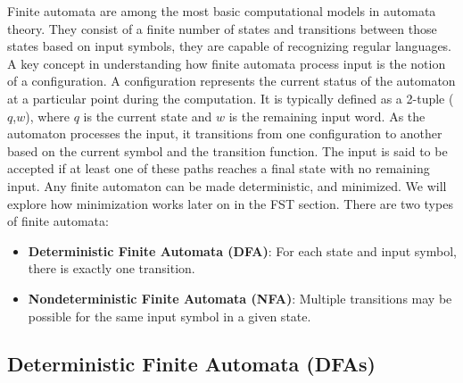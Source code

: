 Finite automata are among the most basic computational models in automata theory. 
They consist of a finite number of states and transitions between those states based on input symbols, they are capable of recognizing regular languages.
A key concept in understanding how finite automata process input is the notion of a configuration. 
A configuration represents the current status of the automaton at a particular point during the computation. 
It is typically defined as a 2-tuple (\(q\),\(w\)), where \(q\) is the current state and \(w\) is the remaining input word. 
As the automaton processes the input, it transitions from one configuration to another based on the current symbol and the transition function.
The input is said to be accepted if at least one of these paths reaches a final state with no remaining input.
Any finite automaton can be made deterministic, and minimized. We will explore how minimization works later on in the FST section.
There are two types of finite automata:
\begin{itemize}
    \item \textbf{Deterministic Finite Automata (DFA)}: For each state and input symbol, there is exactly one transition.
    \item \textbf{Nondeterministic Finite Automata (NFA)}: Multiple transitions may be possible for the same input symbol in a given state.
\end{itemize}

\subsection{Deterministic Finite Automata (DFAs)}

